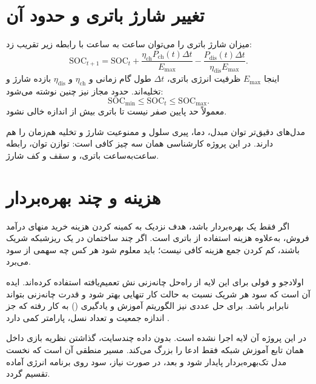 \section{تغییر شارژ باتری و حدود آن}
میزان شارژ باتری را می‌توان ساعت به ساعت با رابطه زیر تقریب زد:
\begin{equation}
  \mathrm{SOC}_{t+1}=\mathrm{SOC}_{t}
  +\frac{\eta_{\mathrm{ch}}P_{\mathrm{ch}}(t)\Delta t}{E_{\max}}
  -\frac{P_{\mathrm{dis}}(t)\Delta t}{\eta_{\mathrm{dis}}E_{\max}}.
  \label{eq:soc-dynamics}
\end{equation}
اینجا $E_{\max}$ ظرفیت انرژی باتری، $\Delta t$ طول گام زمانی و $\eta_{\mathrm{ch}}$ و $\eta_{\mathrm{dis}}$ بازده شارژ و تخلیه‌اند. حدود مجاز نیز چنین نوشته می‌شود:
\begin{equation}
  \mathrm{SOC}_{\min}\leq \mathrm{SOC}_{t}\leq \mathrm{SOC}_{\max}.
  \label{eq:soc-bounds}
\end{equation}
معمولاً حد پایین صفر نیست تا باتری بیش از اندازه خالی نشود.

مدل‌های دقیق‌تر توان مبدل، دما، پیری سلول و ممنوعیت شارژ و تخلیه هم‌زمان را هم دارند. در این پروژه کارشناسی همان سه چیز کافی است: توازن توان، رابطه ساعت‌به‌ساعت باتری، و سقف و کف شارژ.

\section{هزینه و چند بهره‌بردار}
اگر فقط یک بهره‌بردار باشد، هدف نزدیک به کمینه کردن هزینه خرید منهای درآمد فروش، به‌علاوه هزینه استفاده از باتری است. اگر چند ساختمان در یک ریزشبکه شریک باشند، کم کردن جمع هزینه کافی نیست؛ باید معلوم شود هر کس چه سهمی از سود می‌برد.

اولادجو و فولی برای این لایه از راه‌حل چانه‌زنی نش تعمیم‌یافته استفاده کرده‌اند. ایده آن است که سود هر شریک نسبت به حالت کار تنهایی بهتر شود و قدرت چانه‌زنی بتواند نابرابر باشد. برای حل عددی نیز الگوریتم آموزش و یادگیری () به کار رفته که جز اندازه جمعیت و تعداد نسل، پارامتر کمی دارد .

در این پروژه آن لایه اجرا نشده است. بدون داده چندسایت، گذاشتن نظریه بازی داخل همان تابع آموزش شبکه فقط ادعا را بزرگ می‌کند. مسیر منطقی آن است که نخست مدل تک‌بهره‌بردار پایدار شود و بعد، در صورت نیاز، سود روی برنامه انرژی آماده تقسیم گردد.

